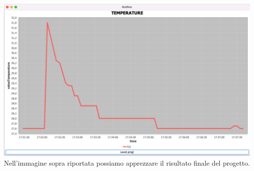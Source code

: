 \includegraphics[width=1\textwidth]{img/chartTemperature}
\\


Nell'immagine sopra riportata possiamo apprezzare il risultato finale del progetto.